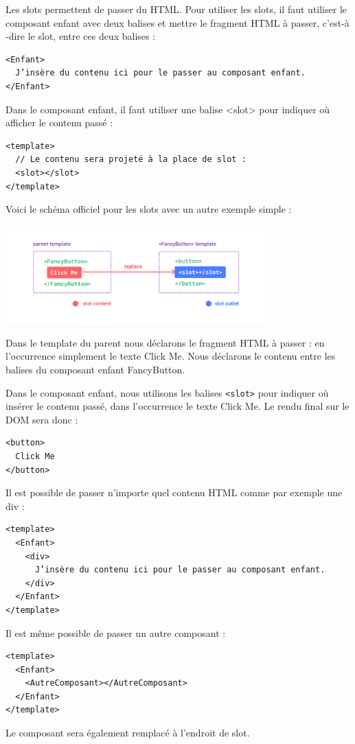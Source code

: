 \documentclass{article}
\begin{document}
Les {\color{monOrange}slots} permettent de passer du HTML. Pour utiliser les {\color{monOrange}slots}, il faut utiliser le composant enfant avec deux balises et mettre le fragment HTML à passer, c'est-à -dire le {\color{monOrange}slot}, entre ces deux balises :
\begin{verbatim}
<Enfant>
  J’insère du contenu ici pour le passer au composant enfant.
</Enfant>
\end{verbatim}
Dans le composant enfant, il faut utiliser une balise {\color{monOrange}<slot>} pour indiquer où afficher le contenu passé :
\begin{verbatim}
<template>
  // Le contenu sera projeté à la place de slot :
  <slot></slot>
</template>
\end{verbatim}
Voici le schéma officiel pour les {\color{monOrange}slots} avec un autre exemple simple :
\begin{center}
\includegraphics[width=10cm]{images/image10.png}
\end{center}

Dans le {\color{monOrange}template} du parent nous déclarons le fragment HTML à passer : en l'occurrence simplement le texte {\color{monOrange}Click Me}. Nous déclarons le contenu entre les balises du composant enfant {\color{monOrange}FancyButton}.

Dans le composant enfant, nous utilisons les balises {\tt <slot>} pour indiquer où insérer le contenu passé, dans l'occurrence le texte {\color{monOrange}Click Me}. Le rendu final sur le DOM sera donc :
\begin{verbatim}
<button>
  Click Me
</button>
\end{verbatim}
Il est possible de passer n'importe quel contenu HTML comme par exemple une {\color{monOrange}div} :
\begin{verbatim}
<template>
  <Enfant>
    <div>
      J’insère du contenu ici pour le passer au composant enfant.
    </div>
  </Enfant>
</template>
\end{verbatim}
Il est même possible de passer un autre composant :
\begin{verbatim}
<template>
  <Enfant>
    <AutreComposant></AutreComposant>
  </Enfant>
</template>
\end{verbatim}
Le composant sera également remplacé à l'endroit de {\color{monOrange}slot}.
\end{document}
